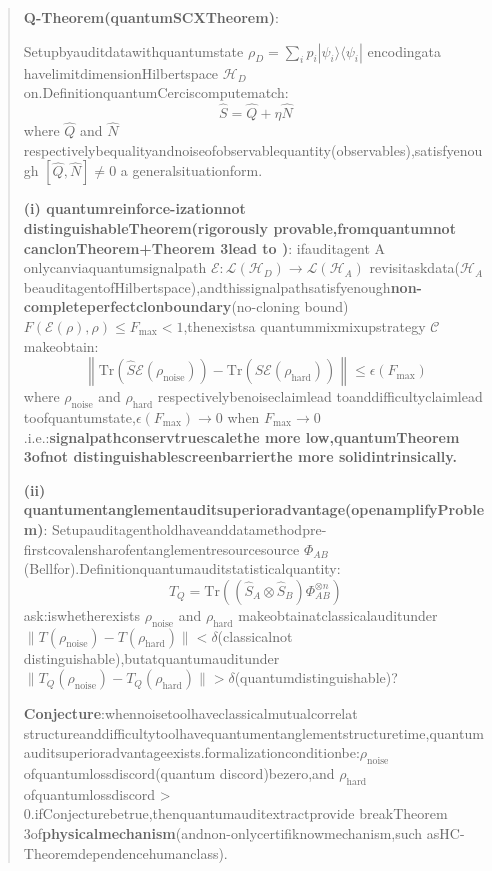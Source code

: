 \documentclass[
  12pt,
]{article}
\begin{document}
\begin{quote}
\textbf{Q-Theorem(quantumSCXTheorem)}:

Setupbyauditdatawithquantumstate
\(\rho_D = \sum_i p_i |\psi_i\rangle\langle\psi_i|\)
encodingata  havelimitdimensionHilbertspace \(\mathcal{H}_D\) on.DefinitionquantumCerciscomputematch:
\[\hat{S} = \hat{Q} + \eta \hat{N}\] where \(\hat{Q}\) and \(\hat{N}\)
respectivelybequalityandnoiseofobservablequantity(observables),satisfyenough
\([\hat{Q}, \hat{N}] \neq 0\) a generalsituationform.

\textbf{(i) quantumreinforce-izationnot distinguishableTheorem(rigorously provable,fromquantumnot canclonTheorem+Theorem
3lead to )}: ifauditagent A onlycanviaquantumsignalpath
\(\mathcal{E}: \mathcal{L}(\mathcal{H}_D) \to \mathcal{L}(\mathcal{H}_A)\)
revisitaskdata(\(\mathcal{H}_A\)
beauditagentofHilbertspace),andthissignalpathsatisfyenough\textbf{non-completeperfectclonboundary}(no-cloning
bound)\(F(\mathcal{E}(\rho), \rho) \leq F_{\max} < 1\),thenexistsa  quantummixmixupstrategy
\(\mathcal{C}\) makeobtain:
\[\left\| \text{Tr}(\hat{S} \mathcal{E}(\rho_{\text{noise}})) - \text{Tr}(\hat{S} \mathcal{E}(\rho_{\text{hard}})) \right\| \leq \epsilon(F_{\max})\]
where \(\rho_{\text{noise}}\) and \(\rho_{\text{hard}}\)
respectivelybenoiseclaimlead toanddifficultyclaimlead toofquantumstate,\(\epsilon(F_{\max}) \to 0\) when
\(F_{\max} \to 0\).i.e.:\textbf{signalpathconservtruescalethe more low,quantumTheorem
3ofnot distinguishablescreenbarrierthe more solidintrinsically.}

\textbf{(ii) quantumentanglementauditsuperioradvantage(openamplifyProblem)}:
Setupauditagentholdhaveanddatamethodpre-firstcovalensharofentanglementresourcesource
\(\Phi_{AB}\)(Bellfor).Definitionquantumauditstatisticalquantity:
\[T_Q = \text{Tr}\left((\hat{S}_A \otimes \hat{S}_B) \Phi_{AB}^{\otimes n}\right)\]
ask:iswhetherexists \(\rho_{\text{noise}}\) and \(\rho_{\text{hard}}\)
makeobtainatclassicalauditunder
\(\|T(\rho_{\text{noise}}) - T(\rho_{\text{hard}})\| < \delta\)(classicalnot distinguishable),butatquantumauditunder
\(\|T_Q(\rho_{\text{noise}}) - T_Q(\rho_{\text{hard}})\| > \delta\)(quantumdistinguishable)?

\textbf{Conjecture}:whennoisetoolhaveclassicalmutualcorrelat structureanddifficultytoolhavequantumentanglementstructuretime,quantumauditsuperioradvantageexists.formalizationconditionbe:\(\rho_{\text{noise}}\)
ofquantumlossdiscord(quantum discord)bezero,and \(\rho_{\text{hard}}\) ofquantumlossdiscord
\textgreater{} 0.ifConjecturebetrue,thenquantumauditextractprovide breakTheorem
3of\textbf{physicalmechanism}(andnon-onlycertifiknowmechanism,such asHC-Theoremdependencehumanclass).


\end{quote}
\end{document}
